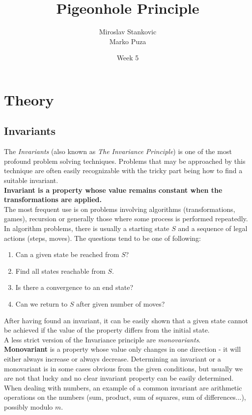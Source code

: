 \documentclass[11pt,a5paper]{article}
\title{\textbf{Pigeonhole Principle}}
\date{Week 5}
\author{Miroslav Stankovic\\ Marko Puza}
\begin{document}
\maketitle

\section{Theory}
\subsection*{Invariants}

The \emph{Invariants} (also known as \emph{The Invariance Principle}) is one of the most profound problem solving techniques. Problems that may be approached by this technique are often easily recognizable with the tricky part being how to find a suitable invariant.\\ 

\noindent\textbf{Invariant is a property whose value remains constant when the transformations are applied.}\\

\noindent The most frequent use is on problems involving algorithms (transformations, games), recursion or generally those where some process is performed repeatedly. In algorithm problems, there is usually a starting state $S$ and a sequence of legal actions (steps, moves). The questions tend to be one of following: 
\begin{enumerate}
\item {Can a given state be reached from $S$?}
\item {Find all states reachable from $S$.}
\item {Is there a convergence to an end state?}
\item {Can we return to $S$ after given number of moves?}
\end{enumerate}

\noindent After having found an invariant, it can be easily shown that a given state cannot be achieved if the value of the property differs from the initial state. \\

\noindent A less strict version of the Invariance principle are \emph{monovariants}. \\\textbf{Monovariant} is a property whose value only changes in one direction - it will either always increase or always decrease. Determining an invariant or a monovariant is in some cases obvious from the given conditions, but usually we are not that lucky and no clear invariant property can be easily determined. When dealing with numbers, an example of a common invariant are arithmetic operations on the numbers (sum, product, sum of squares, sum of differences...), possibly modulo $m$.\\
\end{document}
